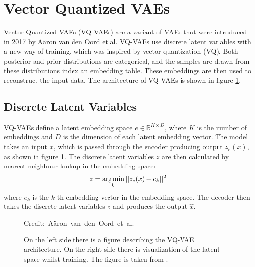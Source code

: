 \pagebreak

\section{Vector Quantized VAEs}

Vector Quantized VAEs (VQ-VAEs) are a variant of VAEs that were introduced in 2017 by Aäron van den Oord et al\cite{vqvae}. VQ-VAEs use discrete latent variables with a new way of training, which was inspired by vector quantization (VQ). Both posterior and prior distributions are categorical, and the samples are drawn from these distributions index an embedding table\cite{vqvae}. These embeddings are then used to reconstruct the input data. The architecture of VQ-VAEs is shown in figure \ref{VQVAEFigure}.

\subsection {Discrete Latent Variables}

VQ-VAEs define a latent embedding space $ e \in \mathbb{R}^{K \times D} $, where $K$ is the number of embeddings and $D$ is the dimension of each latent embedding vector. The model takes an input $x$, which is passed through the encoder producing output $z_e(x)$, as shown in figure \ref{VQVAEFigure}. 
The discrete latent variables $z$ are then calculated by nearest neighbour lookup in the embedding space: \[ z = \operatorname*{arg\,min}_{k} || z_e(x) - e_k ||^2 \] where $e_k$ is the $k$-th embedding vector in the embedding space. The decoder then takes the discrete latent variables $z$ and produces the output $\hat{x}$.

\begin{figure}[H]
    \centering

    \caption{On the left side there is a figure describing the VQ-VAE architecture. On the right side there is visualization of the latent space whilst training. The figure is taken from \cite{vqvae}.}
  	\medskip 
	\hspace*{15pt}\hbox{\scriptsize Credit: Aäron van den Oord et al.}
    \label{VQVAEFigure}
\end{figure}


